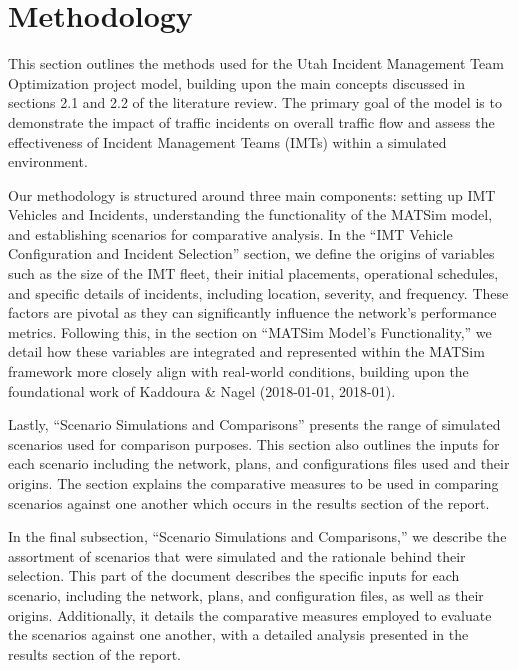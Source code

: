 \documentclass[fancy, oneside, mastersfancy, ms]{byuthesis}
\begin{document}

\hypertarget{methodology}{%
\chapter{Methodology}\label{methodology}}

This section outlines the methods used for the Utah Incident Management
Team Optimization project model, building upon the main concepts
discussed in sections 2.1 and 2.2 of the literature review. The primary
goal of the model is to demonstrate the impact of traffic incidents on
overall traffic flow and assess the effectiveness of Incident Management
Teams (IMTs) within a simulated environment.

Our methodology is structured around three main components: setting up
IMT Vehicles and Incidents, understanding the functionality of the
MATSim model, and establishing scenarios for comparative analysis. In
the ``IMT Vehicle Configuration and Incident Selection'' section, we
define the origins of variables such as the size of the IMT fleet, their
initial placements, operational schedules, and specific details of
incidents, including location, severity, and frequency. These factors
are pivotal as they can significantly influence the network's
performance metrics. Following this, in the section on ``MATSim Model's
Functionality,'' we detail how these variables are integrated and
represented within the MATSim framework more closely align with
real-world conditions, building upon the foundational work of Kaddoura
\& Nagel (2018-01-01, 2018-01).

Lastly, ``Scenario Simulations and Comparisons'' presents the range of
simulated scenarios used for comparison purposes. This section also
outlines the inputs for each scenario including the network, plans, and
configurations files used and their origins. The section explains the
comparative measures to be used in comparing scenarios against one
another which occurs in the results section of the report.

In the final subsection, ``Scenario Simulations and Comparisons,'' we
describe the assortment of scenarios that were simulated and the
rationale behind their selection. This part of the document describes
the specific inputs for each scenario, including the network, plans, and
configuration files, as well as their origins. Additionally, it details
the comparative measures employed to evaluate the scenarios against one
another, with a detailed analysis presented in the results section of
the report.
\end{document}

